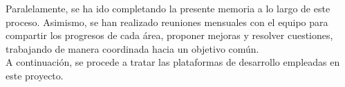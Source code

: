 Paralelamente, se ha ido completando la presente memoria a lo largo de este proceso.
Asimismo, se han realizado reuniones mensuales con el equipo para compartir los progresos de cada área, proponer mejoras y resolver cuestiones, trabajando de manera coordinada hacia un objetivo común.\\

A continuación, se procede a tratar las plataformas de desarrollo empleadas en este proyecto.
